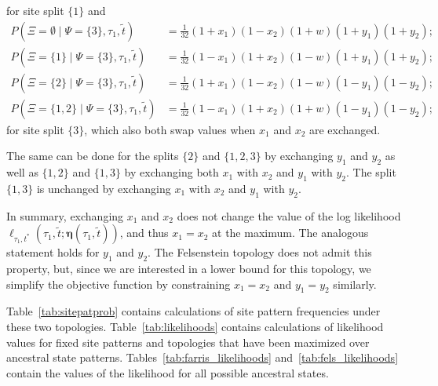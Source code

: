 \documentclass{article}
\newcommand{\fullAncestralSplitPartitions}{\boldsymbol\eta}
\newcommand{\siteSplitRV}{\Psi}
\newcommand{\ancestralSplitRV}{\Xi}
\begin{document}
for site split $\{1\}$ and
\begin{align*}
        P(\ancestralSplitRV=\emptyset \mid \siteSplitRV=\{3\}, \tau_1, \tilde{t}) &= \frac{1}{32}(1+x_1)(1-x_2)(1+w)(1+y_1)(1+y_2); \\
    P(\ancestralSplitRV=\{1\} \mid \siteSplitRV=\{3\}, \tau_1, \tilde{t}) &= \frac{1}{32}(1-x_1)(1+x_2)(1-w)(1+y_1)(1+y_2); \\
    P(\ancestralSplitRV=\{2\} \mid \siteSplitRV=\{3\}, \tau_1, \tilde{t}) &= \frac{1}{32}(1+x_1)(1-x_2)(1-w)(1-y_1)(1-y_2); \\
    P(\ancestralSplitRV=\{1,2\} \mid \siteSplitRV=\{3\}, \tau_1, \tilde{t}) &= \frac{1}{32}(1-x_1)(1+x_2)(1+w)(1-y_1)(1-y_2);
\end{align*}
for site split $\{3\}$, which also both swap values when $x_1$ and $x_2$ are exchanged.

The same can be done for the splits $\{2\}$ and $\{1,2,3\}$ by exchanging $y_1$ and $y_2$ as well as $\{1,2\}$ and $\{1,3\}$ by exchanging both $x_1$ with $x_2$ and $y_1$ with $y_2$.
The split $\{1,3\}$ is unchanged by exchanging $x_1$ with $x_2$ and $y_1$ with $y_2$.

In summary, exchanging $x_1$ and $x_2$ does not change the value of the log likelihood $\ell_{\tau_1,t^*}(\tau_1, \tilde{t}; \fullAncestralSplitPartitions(\tau_1,\tilde{t}))$, and thus $x_1=x_2$ at the maximum.
The analogous statement holds for $y_1$ and $y_2$.
The Felsenstein topology does not admit this property, but, since we are interested in a lower bound for this topology, we simplify the objective function by constraining $x_1=x_2$ and $y_1=y_2$ similarly.

Table~\ref{tab:sitepatprob} contains calculations of site pattern frequencies under these two topologies.
Table~\ref{tab:likelihoods} contains calculations of likelihood values for fixed site patterns and topologies that have been maximized over ancestral state patterns.
Tables~\ref{tab:farris_likelihoods} and~\ref{tab:fels_likelihoods} contain the values of the likelihood for all possible ancestral states.
\end{document}
